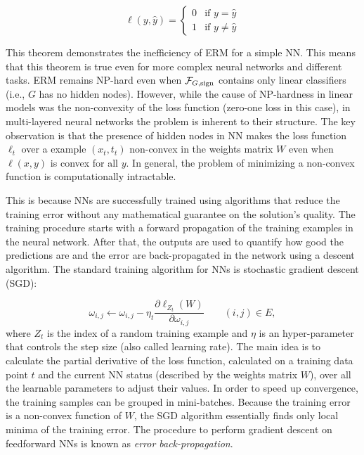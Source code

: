 \begin{equation}
	\label{formula:zero-oneloss}
	\ell(y, \hat y) = 
	\begin{cases}
	0 & \text{if $y = \hat y$} \\
	1 & \text{if $y \neq \hat y$}
	\end{cases}
\end{equation}

This theorem demonstrates the inefficiency of ERM for a simple NN. This means that this theorem is true even for more complex neural networks and different tasks. ERM remains NP-hard even when $\mathcal{F}_{G,\operatorname{sign}}$ contains only linear classifiers (i.e., $G$ has no hidden nodes). However, while the cause of NP-hardness in linear models was the non-convexity of the loss function (zero-one loss in this case), in multi-layered neural networks the problem is inherent to their structure. The key observation is that the presence of hidden nodes in NN makes the loss function $\ell_t$ over a example $(x_t, t_t)$ non-convex in the weights matrix $W$ even when $\ell(x, y)$ is convex for all $y$. In general, the problem of minimizing a non-convex function is computationally intractable.  

This is because NNs are successfully trained using algorithms that reduce the training error without any mathematical guarantee on the solution's quality. The training procedure starts with a forward propagation of the training examples in the neural network. After that, the outputs are used to quantify how good the predictions are and the error are back-propagated in the network using a descent algorithm. The standard training algorithm for NNs is stochastic gradient descent (SGD):

\begin{equation}
\omega_{i, j} \leftarrow \omega_{i, j} - \eta_t \frac{\partial\ell_{Z_t}(W)}{\partial\omega_{i, j}} \quad \quad (i, j) \in E,
\end{equation}
where $Z_t$ is the index of a random training example and $\eta$ is an hyper-parameter that controls the step size (also called learning rate). The main idea is to calculate the partial derivative of the loss function, calculated on a training data point $t$ and the current NN status (described by the weights matrix $W$), over all the learnable parameters to adjust their values. In order to speed up convergence, the training samples can be grouped in mini-batches. Because the training error is a non-convex function of $W$, the SGD algorithm essentially finds only local minima of the training error. The procedure to perform gradient descent on feedforward NNs is known as \textit{error back-propagation}. 

